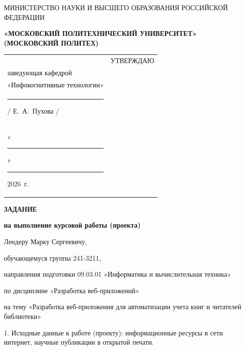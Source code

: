 \documentclass[14pt, a4paper]{extarticle}
\begin{document}
\pagestyle{empty}


\begin{center}
    {\small МИНИСТЕРСТВО НАУКИ И ВЫСШЕГО ОБРАЗОВАНИЯ РОССИЙСКОЙ ФЕДЕРАЦИИ}


    {\small \textbf{«МОСКОВСКИЙ ПОЛИТЕХНИЧЕСКИЙ УНИВЕРСИТЕТ»}} \\
    {\small \textbf{(МОСКОВСКИЙ ПОЛИТЕХ)}}
\end{center}

\begin{tabularx}{\textwidth}{@{} p{} p{} @{}}
     &
    \raggedright
    УТВЕРЖДАЮ                          \\
    заведующая кафедрой                \\
    «Инфокогнитивные технологии»       \\[0.3cm]

    \rule{3cm}{0.4pt} / Е.~А.~Пухова / \\[0.1cm]

    «\rule{0.8cm}{0.4pt}» \rule{3cm}{0.4pt} 2026~г.
\end{tabularx}


\begin{center}

    { \large \textbf{ЗАДАНИЕ}}

    \textbf{на выполнение курсовой работы (проекта)}

    Лендеру Марку Сергеевичу, %

\end{center}

обучающемуся группы 241-3211,

направления подготовки 09.03.01 «Информатика и вычислительная техника»

по дисциплине «Разработка веб-приложений»

на тему «Разработка веб-приложения для автоматизации учета книг и читателей библиотеки»

1. Исходные данные к работе (проекту): информационные ресурсы в сети
интернет, научные публикации в открытой печати.
\end{document}
